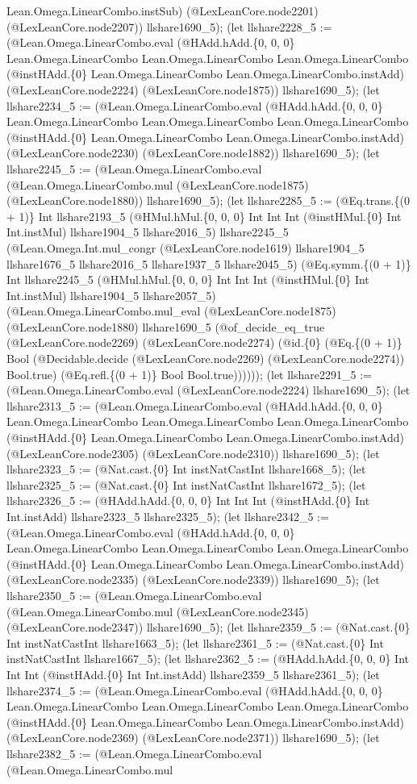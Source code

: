\documentclass[11pt]{article}
\begin{document}
Lean.Omega.LinearCombo.instSub) (@LexLeanCore.node2201) (@LexLeanCore.node2207)) llshare1690\_5); (let llshare2228\_5 := (@Lean.Omega.LinearCombo.eval (@HAdd.hAdd.\{0, 0, 0\} Lean.Omega.LinearCombo Lean.Omega.LinearCombo Lean.Omega.LinearCombo (@instHAdd.\{0\} Lean.Omega.LinearCombo Lean.Omega.LinearCombo.instAdd) (@LexLeanCore.node2224) (@LexLeanCore.node1875)) llshare1690\_5); (let llshare2234\_5 := (@Lean.Omega.LinearCombo.eval (@HAdd.hAdd.\{0, 0, 0\} Lean.Omega.LinearCombo Lean.Omega.LinearCombo Lean.Omega.LinearCombo (@instHAdd.\{0\} Lean.Omega.LinearCombo Lean.Omega.LinearCombo.instAdd) (@LexLeanCore.node2230) (@LexLeanCore.node1882)) llshare1690\_5); (let llshare2245\_5 := (@Lean.Omega.LinearCombo.eval (@Lean.Omega.LinearCombo.mul (@LexLeanCore.node1875) (@LexLeanCore.node1880)) llshare1690\_5); (let llshare2285\_5 := (@Eq.trans.\{(0 + 1)\} Int llshare2193\_5 (@HMul.hMul.\{0, 0, 0\} Int Int Int (@instHMul.\{0\} Int Int.instMul) llshare1904\_5 llshare2016\_5) llshare2245\_5 (@Lean.Omega.Int.mul\_congr (@LexLeanCore.node1619) llshare1904\_5 llshare1676\_5 llshare2016\_5 llshare1937\_5 llshare2045\_5) (@Eq.symm.\{(0 + 1)\} Int llshare2245\_5 (@HMul.hMul.\{0, 0, 0\} Int Int Int (@instHMul.\{0\} Int Int.instMul) llshare1904\_5 llshare2057\_5) (@Lean.Omega.LinearCombo.mul\_eval (@LexLeanCore.node1875) (@LexLeanCore.node1880) llshare1690\_5 (@of\_decide\_eq\_true (@LexLeanCore.node2269) (@LexLeanCore.node2274) (@id.\{0\} (@Eq.\{(0 + 1)\} Bool (@Decidable.decide (@LexLeanCore.node2269) (@LexLeanCore.node2274)) Bool.true) (@Eq.refl.\{(0 + 1)\} Bool Bool.true)))))); (let llshare2291\_5 := (@Lean.Omega.LinearCombo.eval (@LexLeanCore.node2224) llshare1690\_5); (let llshare2313\_5 := (@Lean.Omega.LinearCombo.eval (@HAdd.hAdd.\{0, 0, 0\} Lean.Omega.LinearCombo Lean.Omega.LinearCombo Lean.Omega.LinearCombo (@instHAdd.\{0\} Lean.Omega.LinearCombo Lean.Omega.LinearCombo.instAdd) (@LexLeanCore.node2305) (@LexLeanCore.node2310)) llshare1690\_5); (let llshare2323\_5 := (@Nat.cast.\{0\} Int instNatCastInt llshare1668\_5); (let llshare2325\_5 := (@Nat.cast.\{0\} Int instNatCastInt llshare1672\_5); (let llshare2326\_5 := (@HAdd.hAdd.\{0, 0, 0\} Int Int Int (@instHAdd.\{0\} Int Int.instAdd) llshare2323\_5 llshare2325\_5); (let llshare2342\_5 := (@Lean.Omega.LinearCombo.eval (@HAdd.hAdd.\{0, 0, 0\} Lean.Omega.LinearCombo Lean.Omega.LinearCombo Lean.Omega.LinearCombo (@instHAdd.\{0\} Lean.Omega.LinearCombo Lean.Omega.LinearCombo.instAdd) (@LexLeanCore.node2335) (@LexLeanCore.node2339)) llshare1690\_5); (let llshare2350\_5 := (@Lean.Omega.LinearCombo.eval (@Lean.Omega.LinearCombo.mul (@LexLeanCore.node2345) (@LexLeanCore.node2347)) llshare1690\_5); (let llshare2359\_5 := (@Nat.cast.\{0\} Int instNatCastInt llshare1663\_5); (let llshare2361\_5 := (@Nat.cast.\{0\} Int instNatCastInt llshare1667\_5); (let llshare2362\_5 := (@HAdd.hAdd.\{0, 0, 0\} Int Int Int (@instHAdd.\{0\} Int Int.instAdd) llshare2359\_5 llshare2361\_5); (let llshare2374\_5 := (@Lean.Omega.LinearCombo.eval (@HAdd.hAdd.\{0, 0, 0\} Lean.Omega.LinearCombo Lean.Omega.LinearCombo Lean.Omega.LinearCombo (@instHAdd.\{0\} Lean.Omega.LinearCombo Lean.Omega.LinearCombo.instAdd) (@LexLeanCore.node2369) (@LexLeanCore.node2371)) llshare1690\_5); (let llshare2382\_5 := (@Lean.Omega.LinearCombo.eval (@Lean.Omega.LinearCombo.mul 
\end{document}
